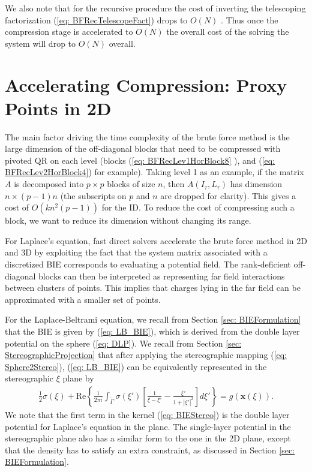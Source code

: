 \documentclass{sfuthesis}
\begin{document}
We also note that for the recursive procedure the cost of inverting the telescoping factorization (\ref{eq: BFRecTelescopeFact}) drops to $O(N)$ \cite{MartRokh2005}. Thus once the compression stage is accelerated to $O(N)$ the overall cost of the solving the system will drop to $O(N)$ overall. 


\section{Accelerating Compression: Proxy Points in 2D} 
\label{sec: 2DProxy}
The main factor driving the time complexity of the brute force method is the large dimension of the off-diagonal blocks that need to be compressed with pivoted QR on each level (blocks (\ref{eq: BFRecLev1HorBlock8} ), and (\ref{eq: BFRecLev2HorBlock4}) for example). Taking level 1 as an example, if the matrix $A$ is decomposed into $p \times p$ blocks of size $n$, then $A(I_\tau, L_\tau)$ has dimension $n \times (p-1)n$  (the subscripts on $p$ and $n$ are dropped for clarity). This gives a cost of $O(kn^2(p-1))$ for the ID. To reduce the cost of compressing such a block, we want to reduce its dimension without changing its range. 

For Laplace's equation, fast direct solvers accelerate the brute force method in 2D and 3D by exploiting the fact that the system matrix associated with a discretized BIE corresponds to evaluating a potential field. The rank-deficient off-diagonal blocks can then be interpreted as representing far field interactions between clusters of points. This implies that charges lying in the far field can be approximated with a smaller set of points. 

For the Laplace-Beltrami equation, we recall from Section \ref{sec: BIEFormulation} that the BIE is given by (\ref{eq: LB_BIE}), which is derived from the double layer potential on the sphere (\ref{eq: DLP}). 
We recall from Section \ref{sec: StereographicProjection} that after applying the stereographic mapping (\ref{eq: Sphere2Stereo}), (\ref{eq: LB_BIE}) can be equivalently represented in the stereographic $\xi$ plane by 
\begin{align}
	\frac{1}{2}\sigma(\xi)+\text{Re}\left\{\frac{1}{2\pi i}\int_{\tilde{\Gamma}} \sigma(\xi ')\left[\frac{1}{\xi -\xi '} - \frac{\bar{\xi} ' }{1+ {|\xi '|}^2}\right] d\xi ' \right\}= g(\mathbf{x}(\xi)). 
	\label{eq: BIEStereo}
\end{align}
We note that the first term in the kernel (\ref{eq: BIEStereo}) is the double layer potential for Laplace's equation in the plane. 
The single-layer potential in the stereographic plane also has a similar form to the one in the 2D plane, except that the density has to satisfy an extra constraint, as discussed in Section \ref{sec: BIEFormulation}. 
\end{document}

